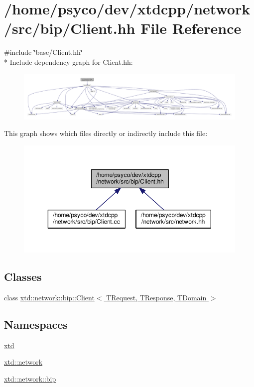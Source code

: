 \hypertarget{bip_2Client_8hh}{}\section{/home/psyco/dev/xtdcpp/network/src/bip/\+Client.hh File Reference}
\label{bip_2Client_8hh}
{\ttfamily \#include \char`\"{}base/\+Client.\+hh\char`\"{}}\\*
Include dependency graph for Client.\+hh\+:
\nopagebreak
\begin{figure}[H]
\begin{center}
\leavevmode
\includegraphics[width=350pt]{bip_2Client_8hh__incl}
\end{center}
\end{figure}
This graph shows which files directly or indirectly include this file\+:
\nopagebreak
\begin{figure}[H]
\begin{center}
\leavevmode
\includegraphics[width=350pt]{bip_2Client_8hh__dep__incl}
\end{center}
\end{figure}
\subsection*{Classes}
\begin{DoxyCompactItemize}
\item 
class \hyperlink{classxtd_1_1network_1_1bip_1_1Client}{xtd\+::network\+::bip\+::\+Client$<$ T\+Request, T\+Response, T\+Domain $>$}
\end{DoxyCompactItemize}
\subsection*{Namespaces}
\begin{DoxyCompactItemize}
\item 
 \hyperlink{namespacextd}{xtd}
\item 
 \hyperlink{namespacextd_1_1network}{xtd\+::network}
\item 
 \hyperlink{namespacextd_1_1network_1_1bip}{xtd\+::network\+::bip}
\end{DoxyCompactItemize}
